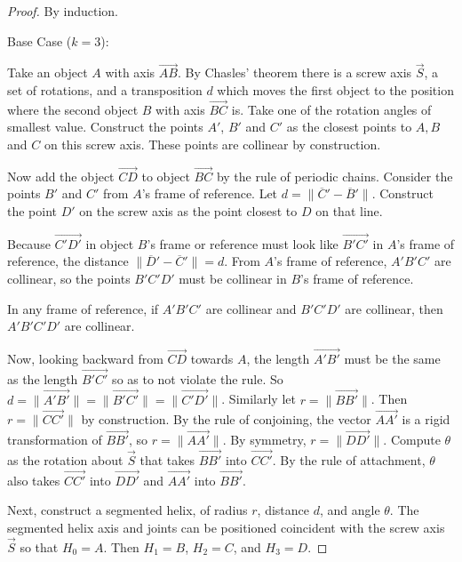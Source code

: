 \documentclass[mathematics,article,submit,pdftex,moreauthors]{Definitions/mdpi}
\begin{document}
\begin{proof}
  By induction.

  Base Case ($k = 3$):

  Take an object $A$ with axis $\overrightarrow{AB}$.
  By Chasles' theorem \cite{wiki:chasles}
  there is a screw axis $\overrightarrow{S}$,
  a set of rotations,  and a transposition $d$ which moves
  the first object to the
  position where the second object $B$ with axis $\overrightarrow{BC}$ is.
  Take one of the rotation angles of smallest value.
  Construct the points $A'$, $B'$ and $C'$ as the closest points
  to $A,B$ and $C$ on this screw axis. These points are collinear by construction.

  Now add the object $\overrightarrow{CD}$ to object $\overrightarrow{BC}$
  by the rule of periodic chains. Consider the points
  $B'$ and $C'$ from $A$'s frame of reference. Let $d = \| \overline C' - \overline B' \|$.
  Construct the point $D'$ on the screw axis as the point closest to $D$ on that line.

  Because $\overrightarrow{C'D'}$ in object $B$'s frame or reference must look like $\overrightarrow{B'C'}$ in $A$'s frame of reference,
  the distance $\| \overline D' - \overline C' \| = d$.
  From $A$'s frame of reference, $A'B'C'$ are collinear, so the points $B'C'D'$ must be collinear in
  $B$'s frame of reference.

  In any frame of reference, if $A'B'C'$ are collinear and $B'C'D'$ are collinear, then $A'B'C'D'$
  are collinear.

  Now, looking backward from $\overrightarrow{CD}$ towards $A$, the length $\overrightarrow{A'B'}$ must be the same as the
  length $\overrightarrow{B'C'}$ so as to not violate the rule. So $d = \| \overrightarrow{A'B'} \| = \| \overrightarrow{B'C'} \| = \| \overrightarrow{C'D'}\|$.
  Similarly let $r = \| \overrightarrow{B B'} \|$. Then $r = \| \overrightarrow{C C'} \|$ by construction.
  By the rule of conjoining, the vector $\overrightarrow{A A'}$ is a rigid transformation of
  $\overrightarrow{B B'}$,
so $r = \| \overrightarrow{A A'} \|$.
  By symmetry, $r = \| \overrightarrow{D D'} \|$.
  Compute $\theta$ as the rotation about $\overrightarrow{S}$ that takes $\overrightarrow{B B'}$
  into $\overrightarrow{C C'}$. By the rule
  of attachment, $\theta$ also takes $\overrightarrow{C C'}$ into $\overrightarrow{D D'}$
  and $\overrightarrow{A A'}$ into $\overrightarrow{B B'}$.

  Next, construct a segmented helix, of radius $r$, distance $d$,
  and angle $\theta$. The segmented helix axis and joints can be positioned coincident with the screw axis
  $\overrightarrow{S}$ so
  that $H_0 = A$. Then $H_1=B$, $H_2=C$, and $H_3=D$.


\end{proof}
\end{document}
